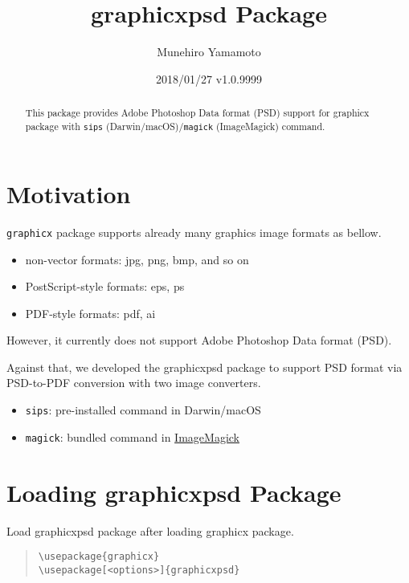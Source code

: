 \documentclass[luatex]{article}
\title{\textsf{graphicxpsd} Package}
\author{Munehiro Yamamoto}
\date{2018/01/27 v1.0.9999}
\begin{document}
\maketitle
\begin{abstract}
This package provides Adobe Photoshop Data format (PSD) support 
for \textsf{graphicx} package
with \texttt{sips} (Darwin/macOS)/\texttt{magick} (ImageMagick) command.
\end{abstract}

\section{Motivation}
\texttt{graphicx} package supports already many graphics image formats as bellow. 
\begin{itemize}
\item non-vector formats: jpg, png, bmp, and so on
\item PostScript-style formats: eps, ps
\item PDF-style formats: pdf, ai
\end{itemize}
However, it currently does not support Adobe Photoshop Data format (PSD). 

Against that, we developed the \textsf{graphicxpsd} package 
to support PSD format via PSD-to-PDF conversion 
with two image converters.
\begin{itemize}
\item \texttt{sips}: 
pre-installed command in Darwin/macOS

\item \texttt{magick}: 
bundled command in \href{https://www.imagemagick.org/}{ImageMagick}
\end{itemize}

\section{Loading \textsf{graphicxpsd} Package}

Load \textsf{graphicxpsd} package after loading \textsf{graphicx} package.

\begin{quote}
\begin{verbatim}
\usepackage{graphicx}
\usepackage[<options>]{graphicxpsd}
\end{verbatim}
\end{quote}
\end{document}
